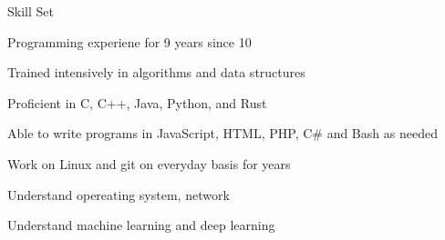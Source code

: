 \documentclass{resume} %
\begin{document}
\begin{rSection}{Skill Set}
    \begin{rSubsection}{}{}{}{}
        \item Programming experiene for 9 years since 10
        \item Trained intensively in algorithms and data structures
        \item Proficient in C, C++, Java, Python, and Rust
        \item Able to write programs in JavaScript, HTML, PHP, C\# and Bash as needed
        \item Work on Linux and git  on everyday basis for years
        \item Understand opereating system, network
        \item Understand machine learning and deep learning
    \end{rSubsection}
\end{rSection}
\end{document}
